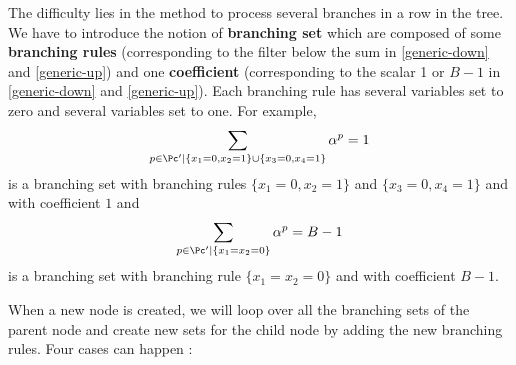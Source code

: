 The difficulty lies in the method to process several branches in a row in the tree. We have to introduce the notion of \textbf{branching set} which are composed of some \textbf{branching rules} (corresponding to the filter below the sum in \eqref{generic-down} and \eqref{generic-up}) and one \textbf{coefficient} (corresponding to the scalar 1 or $B-1$ in \eqref{generic-down} and \eqref{generic-up}). Each branching rule has several variables set to zero and several variables set to one. For example, 
\begin{equation*}
	\sum_{p \in \Pc' | \{x_1 = 0, x_2 = 1\} \cup \{x_3 = 0, x_4 = 1\}} \alpha^p = 1
\end{equation*}
is a branching set with branching rules $\{x_1 = 0, x_2 = 1\}$ and $\{x_3 = 0, x_4 = 1\}$ and with coefficient $1$ and 
\begin{equation*}
	\sum_{p \in \Pc' | \{x_1 = x_2 = 0\}} \alpha^p = B-1
\end{equation*}
is a branching set with branching rule $\{x_1 = x_2 = 0\}$ and with coefficient $B-1$.

When a new node is created, we will loop over all the branching sets of the parent node and create new sets for the child node by adding the new branching rules. Four cases can happen : 

